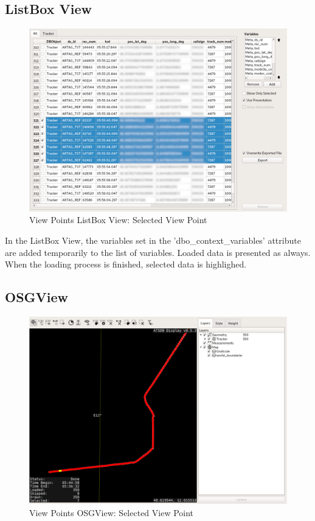 \subsection{ListBox View} 

\begin{figure}[H]
    \hspace*{-2cm}
    \includegraphics[width=18cm,frame]{figures/view_points_listbox_selected.png}
  \caption{View Points ListBox View: Selected View Point}
\end{figure}

In the ListBox View, the variables set in the 'dbo\_context\_variables' attribute are added temporarily to the list of variables. Loaded data is presented as always. When the loading process is finished, selected data is highlighed.


\subsection{OSGView}

\begin{figure}[H]
    \hspace*{-2cm}
    \includegraphics[width=18cm,frame]{figures/view_points_osgview_selected.png}
  \caption{View Points OSGView: Selected View Point}
\end{figure}

